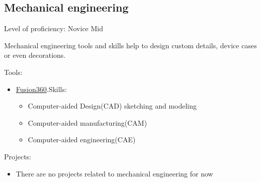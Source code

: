\subsection{Mechanical engineering}

Level of proficiency: Novice Mid

\vintent

Mechanical engineering tools and skills help to design custom details,
device cases or even decorations.

\vintent

Tools:
\begin{itemize}
    \item \href{https://www.autodesk.com/products/fusion-360/overview}{Fusion360}.\break Skills:
    \begin{itemize}
        \item Computer-aided Design(CAD) sketching and modeling
        \item Computer-aided manufacturing(CAM)
        \item Computer-aided engineering(CAE)
    \end{itemize}
\end{itemize}

\vintent

Projects:
\begin{itemize}
    \item There are no projects related to mechanical engineering for now
\end{itemize}
